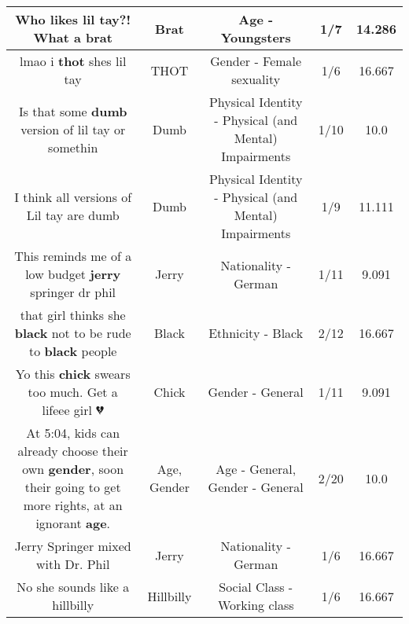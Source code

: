 \documentclass[11pt]{article}
\newlength\mylength
\begin{document}
\begin{center}
\begin{longtable}{|C{.65\mylength}|C{.30\mylength}|C{.12\mylength}|C{.12\mylength}|C{.12\mylength}|}
  \small Who likes lil tay?! What a brat\normalsize   & Brat & Age - Youngsters & 1/7 & 14.286 \\  \hline
  \small lmao i \textbf{thot} shes lil tay\normalsize   & THOT & Gender - Female sexuality & 1/6 & 16.667 \\  \hline
  \small Is that some \textbf{dumb} version of lil tay or somethin\normalsize   & Dumb & Physical Identity - Physical (and Mental) Impairments & 1/10 & 10.0 \\  \hline
  \small I think all versions of Lil tay are dumb\normalsize   & Dumb & Physical Identity - Physical (and Mental) Impairments & 1/9 & 11.111 \\  \hline
  \small This reminds me of a low budget \textbf{jerry} springer dr phil\normalsize   & Jerry & Nationality - German & 1/11 & 9.091 \\  \hline
  \small that girl thinks she \textbf{black} not to be rude to \textbf{black} people\normalsize   & Black & Ethnicity - Black & 2/12 & 16.667 \\  \hline
  \small Yo this \textbf{chick} swears too much. Get a lifeee girl 💔\normalsize   & Chick & Gender - General & 1/11 & 9.091 \\  \hline
  \small At 5:04, kids can already choose their own \textbf{gender}, soon their going to get more rights, at an ignorant \textbf{age}.\normalsize   & Age, Gender & Age - General, Gender - General & 2/20 & 10.0 \\  \hline
  \small Jerry Springer mixed with Dr. Phil\normalsize   & Jerry & Nationality - German & 1/6 & 16.667 \\  \hline
  \small No she sounds like a hillbilly\normalsize   & Hillbilly & Social Class - Working class & 1/6 & 16.667 \\  \hline

\end{longtable}
\end{center}
\end{document}
